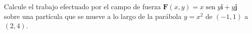 \item Calcule el trabajo efectuado por el campo de fuerza $\mathbf{F}(x, y) = x \operatorname{sen} y \mathbf{i} + y \mathbf{j}$ sobre una partícula que se mueve a lo largo de la parábola $y = x^2$ de $(-1, 1)$ a $(2, 4)$.

